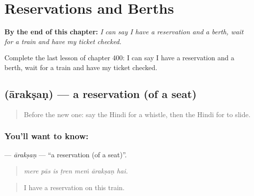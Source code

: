 
\chapter{Reservations and Berths}
\label{ch:hi-reservations-and-berths}

\begin{chapteropening}
\textbf{By the end of this chapter:} \emph{I can say I have a reservation and a berth, wait for a train and have my ticket checked.}

Complete the last lesson of chapter 400: I can say I have a reservation and a berth, wait for a train and have my ticket checked.
\end{chapteropening}

\section[\texorpdfstring{\hi{आरक्षण} (ārakṣaṇ)}{आरक्षण (ārakṣaṇ)}]{ (ārakṣaṇ) — a reservation (of a seat)}

\label{lesson:HI-C400-araksan}



\begin{quote}
Before the new one: say the Hindi for a whistle, then the Hindi for to slide.
\end{quote}

\subsection*{You'll want to know: }
\textbf{} — \emph{ārakṣaṇ} — \textquotedblleft{}a reservation (of a seat)\textquotedblright{}.

\begin{quote}
      
\end{quote}

\begin{quote}
\emph{mere pās is ṭren meṁ ārakṣaṇ hai.}
\end{quote}

\begin{quote}
I have a reservation on this train.
\end{quote}

